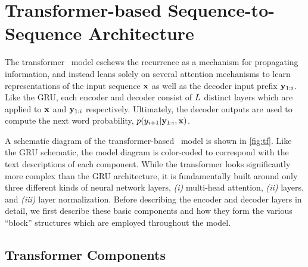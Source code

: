 
\chapter{Transformer-based Sequence-to-Sequence Architecture}
\label{sec:nlgtf}



The transformer \sequencetosequence~model eschews the recurrence as a mechanism
for propagating information, and instead leans solely on several 
attention mechanisms to learn representations of the input sequence $\mathbf{x}$
as well as the decoder input prefix $\mathbf{y}_{1:i}$. Like the GRU,
each encoder and decoder consist of $L$ distinct
layers which are applied to $\mathbf{x}$ and $\mathbf{y}_{1:i}$ respectively.
Ultimately,
the decoder outputs are used to compute the next word probability,
$p(y_{i+1}|\mathbf{y}_{1:i},\mathbf{x})$. 

A schematic diagram of the transformer-based \sequencetosequence~model
is shown in \autoref{fig:tf}. Like the GRU schematic, the model diagram is 
color-coded to correspond with the text descriptions of each component.
While the transformer looks significantly more complex than the 
GRU architecture, it is fundamentally built around only three 
different kinds of 
neural network layers, \textit{(i)} multi-head attention, 
\textit{(ii)} \feedforward layers, and \textit{(iii)} 
layer normalization. Before describing the encoder and decoder layers
in detail, we first describe these basic components and how they form 
the various ``block'' structures which are employed throughout the model.

\section{Transformer Components}

